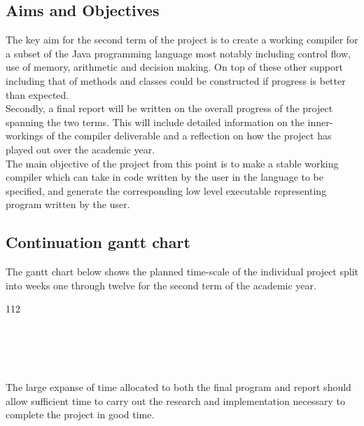\documentclass[a4paper, 11pt]{article}
\begin{document}
\subsection{Aims and Objectives}
The key aim for the second term of the project is to create a working compiler for a subset of the Java programming language most notably including control flow, use of memory, arithmetic and decision making. On top of these other support including that of methods and classes could be constructed if progress is better than expected.
\\\newline
Secondly, a final report will be written on the overall progress of the project spanning the two terms. This will include detailed information on the inner-workings of the compiler deliverable and a reflection on how the project has played out over the academic year.
\\\newline
The main objective of the project from this point is to make a stable working compiler which can take in code written by the user in the language to be specified, and generate the corresponding low level executable representing program written by the user.

\subsection{Continuation gantt chart}
The gantt chart below shows the planned time-scale of the individual project split into weeks one through twelve for the second term of the academic year. \\
\begin{center}
	\begin{ganttchart}[
		vgrid,
		group/.append style={draw=black, fill=black!25},
		milestone/.append style={shape=star}]{1}{12}
	 \\
	\\
	 \\
	 \\
	 \\
	\end{ganttchart}
\end{center}

\noindent The large expanse of time allocated to both the final program and report should allow sufficient time to carry out the research and implementation necessary to complete the project in good time.
\end{document}
